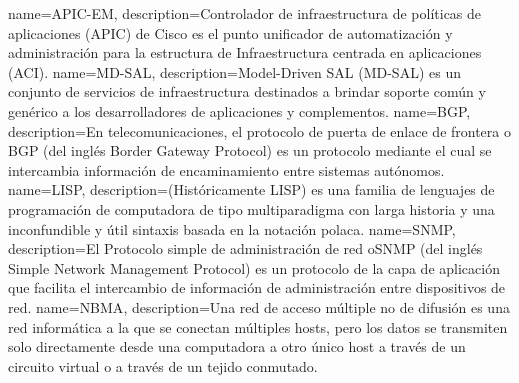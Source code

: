  {
	name={APIC-EM}, 
	description={Controlador de infraestructura de políticas de aplicaciones (APIC) de Cisco es el punto unificador de automatización y administración para la estructura de Infraestructura centrada en aplicaciones (ACI).}
} {
	name={MD-SAL}, 
	description={Model-Driven SAL (MD-SAL) es un conjunto de servicios de infraestructura destinados a brindar soporte común y genérico a los desarrolladores de aplicaciones y complementos.}
} {
	name={BGP}, 
	description={En telecomunicaciones, el protocolo de puerta de enlace de frontera o BGP (del inglés Border Gateway Protocol) es un protocolo mediante el cual se intercambia información de encaminamiento entre sistemas autónomos.}
} {
	name={LISP}, 
	description={(Históricamente LISP) es una familia de lenguajes de programación de computadora de tipo multiparadigma con larga historia y una inconfundible y útil sintaxis basada en la notación polaca.}
} {
	name={SNMP}, 
	description={El Protocolo simple de administración de red oSNMP (del inglés Simple Network Management Protocol) es un protocolo de la capa de aplicación que facilita el intercambio de información de administración entre dispositivos de red.}
} {
	name={NBMA}, 
	description={Una red de acceso múltiple no de difusión es una red informática a la que se conectan múltiples hosts, pero los datos se transmiten solo directamente desde una computadora a otro único host a través de un circuito virtual o a través de un tejido conmutado.}
}
\glsaddall
